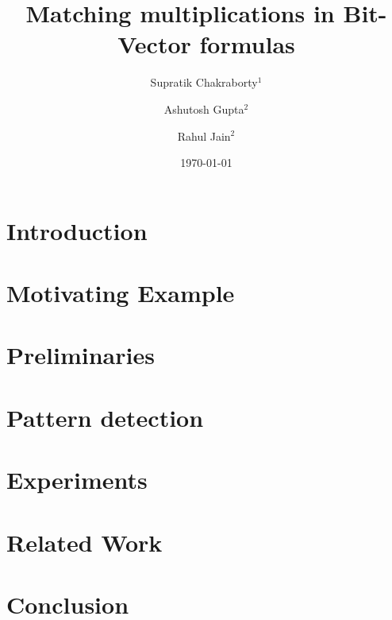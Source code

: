 \documentclass{llncs}
\begin{document}
\title{Matching multiplications in Bit-Vector formulas}

\author{Supratik Chakraborty$^1$ \and Ashutosh Gupta$^2$ \and Rahul Jain$^2$}


\date{\today}

\maketitle
\begin{abstract}

\end{abstract}

\section{Introduction}
\label{sec:intro}


\section{Motivating Example}
\label{sec:motivating}


\section{Preliminaries}
\label{sec:prelim}


\section{Pattern detection}
\label{sec:pattern}


\section{Experiments}
\label{sec:experiments}


\section{Related Work}
\label{sec:related}

\section{Conclusion}
\label{sec:conclusion}




\end{document}
